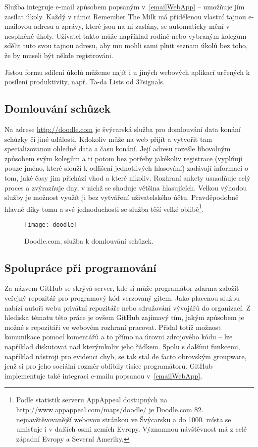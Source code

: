 \documentclass[12pt,oneside,final]{fithesis2}
\begin{document}
Služba integruje e-mail způsobem popsaným v~\ref{emailWebApp} -- umožňuje jím zasílat úkoly. Každý v rámci Remember The Milk má přidělenou vlastní tajnou e-mailovou adresu a zprávy, které jsou na ni zaslány, se automaticky mění v nesplněné úkoly. Uživatel takto může například rodině nebo vybraným kolegům sdělit tuto svou tajnou adresu, aby mu mohli sami plnit seznam úkolů bez toho, že by museli být někde registrováni.

Jistou formu sdílení úkolů můžeme najít i u jiných webových aplikací určených k posílení produktivity, např. Ta-da Lists od 37signals.

\subsection{Domlouvání schůzek}
Na adrese \url{http://doodle.com} je švýcarská služba pro domlouvání data konání schůzky či jiné události. Kdokoliv může na web přijít a vytvořit tam specializovanou  ohledně data a času konání. Její adresu rozešle libovolným způsobem svým kolegům a ti potom bez potřeby jakékoliv registrace (vyplňují pouze jméno, které slouží k odlišení jednotlivých hlasování) zadávají informaci o tom, jaké časy jim přichází vhod a které nikoliv. Rozhraní ankety usnadňuje celý proces a zvýrazňuje dny, v nichž se shoduje většina hlasujících. Velkou výhodou služby je možnost využít ji bez vytváření uživatelského účtu. Pravděpodobně hlavně díky tomu a své jednoduchosti se služba těší velké oblibě\footnote{Podle statistik serveru AppAppeal dostupných na \url{http://www.appappeal.com/maps/doodle/} je Doodle.com 82. nejnavštěvovanější webovou stránkou ve Švýcarsku a do 1000. místa se umisťuje i v dalších osmi zemích Evropy. Významnou návštěvnost má z celé západní Evropy a Severní Ameriky.}.

\begin{figure}[p]
    \texttt{[image: doodle]}
    \caption{Doodle.com, služba k domlouvání schůzek.}
\end{figure}

\subsection{Spolupráce při programování}
Za názvem GitHub se skrývá server, kde si může programátor zdarma založit veřejný repozitář pro programový kód verzovaný gitem. Jako placenou službu nabízí autoři webu privátní repozitáře nebo sdružování vývojářů do organizací. Z hlediska tématu této práce je ovšem GitHub zajímavý tím, jakým způsobem je možné s repozitáři ve webovém rozhraní pracovat. Přidal totiž možnost komunikace pomocí komentářů a to přímo na úrovni zdrojového kódu -- lze například diskutovat nad kterýmkoliv jeho řádkem. Spolu s dalšími funkcemi, například nástroji pro evidenci chyb, se tak stal de facto obrovským groupware, jenž si pro jeho sociální rozměr oblíbily tisíce programátorů. GitHub implementuje také integraci e-mailu popsanou v~\ref{emailWebApp}.
\end{document}
